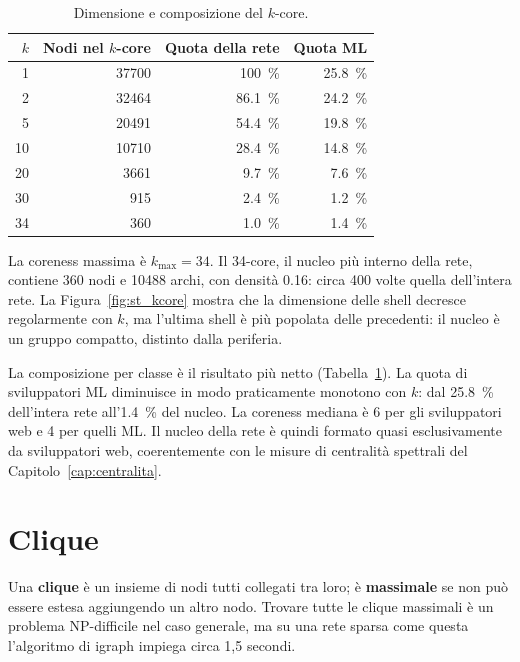 \documentclass[11pt]{report}
\begin{document}
\begin{table}[H]
  \centering
  \caption{Dimensione e composizione del $k$-core.}
  \label{tab:st_kcore}
  \small
  \begin{tabular}{@{}rrrr@{}}
    \toprule
    $k$ & \textbf{Nodi nel $k$-core} & \textbf{Quota della rete} & \textbf{Quota ML} \\
    \midrule
    1  & \num{37700} & \SI{100}{\percent}  & \SI{25.8}{\percent} \\
    2  & \num{32464} & \SI{86.1}{\percent} & \SI{24.2}{\percent} \\
    5  & \num{20491} & \SI{54.4}{\percent} & \SI{19.8}{\percent} \\
    10 & \num{10710} & \SI{28.4}{\percent} & \SI{14.8}{\percent} \\
    20 & \num{3661}  & \SI{9.7}{\percent}  & \SI{7.6}{\percent} \\
    30 & \num{915}   & \SI{2.4}{\percent}  & \SI{1.2}{\percent} \\
    34 & \num{360}   & \SI{1.0}{\percent}  & \SI{1.4}{\percent} \\
    \bottomrule
  \end{tabular}
\end{table}

La coreness massima è $k_{\max}=34$. Il 34-core, il nucleo più interno della rete,
contiene 360 nodi e \num{10488} archi, con densità \num{0.16}: circa 400 volte
quella dell'intera rete. La Figura~\ref{fig:st_kcore} mostra che la dimensione delle
shell decresce regolarmente con $k$, ma l'ultima shell è più popolata delle
precedenti: il nucleo è un gruppo compatto, distinto dalla periferia.

La composizione per classe è il risultato più netto
(Tabella~\ref{tab:st_kcore}). La quota di sviluppatori ML diminuisce in modo
praticamente monotono con $k$: dal \SI{25.8}{\percent} dell'intera rete all'\SI{1.4}{\percent}
del nucleo. La coreness mediana è 6 per gli sviluppatori web e 4 per quelli ML. Il
nucleo della rete è quindi formato quasi esclusivamente da sviluppatori web,
coerentemente con le misure di centralità spettrali del
Capitolo~\ref{cap:centralita}.

\section{Clique}
\label{sec:st_clique}

Una \textbf{clique} è un insieme di nodi tutti collegati tra loro; è
\textbf{massimale} se non può essere estesa aggiungendo un altro nodo. Trovare
tutte le clique massimali è un problema NP-difficile nel caso generale, ma su una
rete sparsa come questa l'algoritmo di igraph impiega circa 1,5 secondi.
\end{document}
